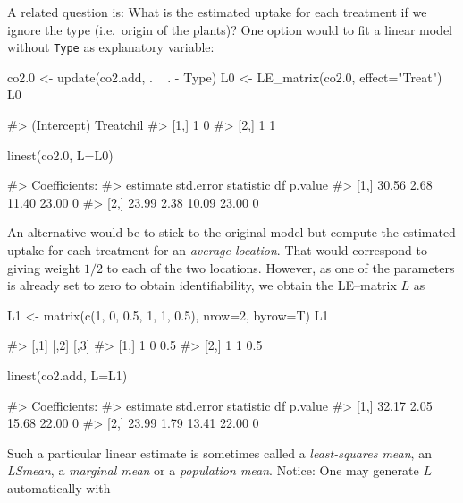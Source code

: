 A related question is: What is the estimated uptake for each treatment
if we ignore the type (i.e.~origin of the plants)? One option would to
fit a linear model without \texttt{Type} as explanatory variable:

\begin{Schunk}
\begin{Sinput}
co2.0 <- update(co2.add, . ~ . - Type)
L0 <- LE_matrix(co2.0, effect="Treat")
L0
\end{Sinput}
\begin{Soutput}
#>      (Intercept) Treatchil
#> [1,]           1         0
#> [2,]           1         1
\end{Soutput}
\begin{Sinput}
linest(co2.0, L=L0)
\end{Sinput}
\begin{Soutput}
#> Coefficients:
#>      estimate std.error statistic    df p.value
#> [1,]    30.56      2.68     11.40 23.00       0
#> [2,]    23.99      2.38     10.09 23.00       0
\end{Soutput}
\end{Schunk}

An alternative would be to stick to the original model but compute the
estimated uptake for each treatment for an \emph{average location}. That
would correspond to giving weight \(1/2\) to each of the two locations.
However, as one of the parameters is already set to zero to obtain
identifiability, we obtain the LE--matrix \(L\) as

\begin{Schunk}
\begin{Sinput}
L1 <- matrix(c(1, 0, 0.5, 
               1, 1, 0.5), nrow=2, byrow=T)
L1
\end{Sinput}
\begin{Soutput}
#>      [,1] [,2] [,3]
#> [1,]    1    0  0.5
#> [2,]    1    1  0.5
\end{Soutput}
\begin{Sinput}
linest(co2.add, L=L1)
\end{Sinput}
\begin{Soutput}
#> Coefficients:
#>      estimate std.error statistic    df p.value
#> [1,]    32.17      2.05     15.68 22.00       0
#> [2,]    23.99      1.79     13.41 22.00       0
\end{Soutput}
\end{Schunk}

Such a particular linear estimate is sometimes called a
\emph{least-squares mean}, an \emph{LSmean}, a \emph{marginal mean} or a
\emph{population mean}. Notice: One may generate \(L\) automatically
with

